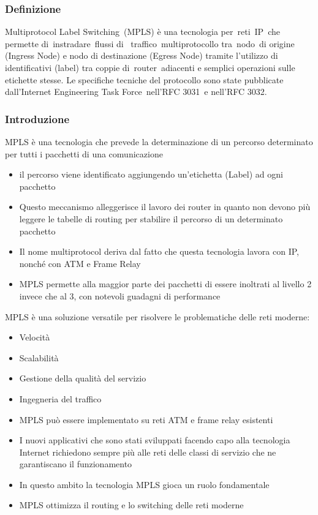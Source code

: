 \documentclass{article}
\begin{document}
\subsubsection{Definizione}
Multiprotocol Label Switching (MPLS) è una tecnologia per reti IP che permette di instradare flussi di 
traffico multiprotocollo tra nodo di origine (Ingress Node) e nodo di destinazione (Egress Node) tramite 
l'utilizzo di identificativi (label) tra coppie di router adiacenti e semplici operazioni sulle etichette 
stesse. Le specifiche tecniche del protocollo sono state pubblicate dall'Internet Engineering Task 
Force nell'RFC 3031 e nell'RFC 3032.
\subsubsection{Introduzione}
MPLS è una tecnologia che prevede la determinazione di un percorso determinato per tutti i pacchetti 
di una comunicazione
\begin{itemize}
    \item il percorso viene identificato aggiungendo un’etichetta (Label) ad ogni pacchetto
    \item Questo meccanismo alleggerisce il lavoro dei router in quanto non devono più leggere le tabelle di 
    routing per stabilire il percorso di un determinato pacchetto
    \item Il nome multiprotocol deriva dal fatto che questa tecnologia lavora con IP, nonché con ATM e Frame Relay
    \item MPLS permette alla maggior parte dei pacchetti di essere inoltrati al livello 2 invece che al 3, 
    con notevoli guadagni di performance
\end{itemize}
\noindent
MPLS è una soluzione versatile per risolvere le problematiche delle reti moderne:
\begin{itemize}
    \item Velocità
    \item Scalabilità
    \item Gestione della qualità del servizio
    \item Ingegneria del traffico
    \item MPLS può essere implementato su reti ATM e frame relay esistenti
    \item I nuovi applicativi che sono stati sviluppati facendo capo alla tecnologia Internet richiedono 
    sempre più alle reti delle classi di servizio che ne garantiscano il funzionamento
    \item In questo ambito la tecnologia MPLS gioca un ruolo fondamentale
    \item MPLS ottimizza il routing e lo switching delle reti moderne
\end{itemize}
\end{document}
